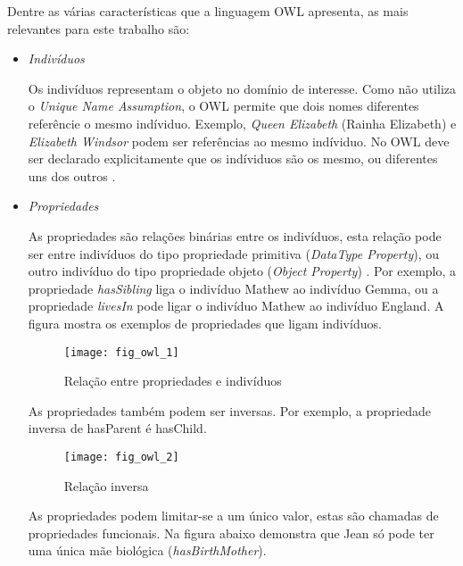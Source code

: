 Dentre as várias características que a linguagem OWL apresenta, as mais 
relevantes para este trabalho são:

\begin{itemize}
    
    \item \textit{Indivíduos}
    
    Os indivíduos representam o objeto no domínio de interesse. Como não 
    utiliza o \textit{Unique Name Assumption}, o OWL permite que dois nomes 
    diferentes referêncie o mesmo indíviduo. Exemplo, \textit{Queen Elizabeth} 
    (Rainha Elizabeth) e \textit{Elizabeth Windsor} podem ser referências ao 
    mesmo indíviduo. No OWL deve ser declarado explicitamente que os indíviduos 
    são os mesmo, ou diferentes uns dos outros \cite{horridge2004practical}.
    
    \item \textit{Propriedades}
    
    As propriedades são relações binárias entre os indivíduos, esta relação pode 
    ser entre indivíduos do tipo propriedade primitiva 
    (\textit{DataType Property}), ou outro indivíduo do tipo propriedade objeto 
    (\textit{Object Property}) \cite{horridge2004practical}. Por exemplo, a 
    propriedade \textit{hasSibling} liga o indivíduo Mathew ao indivíduo Gemma, 
    ou a propriedade \textit{livesIn} pode ligar o indivíduo Mathew ao indivíduo 
    England. A figura mostra os exemplos de propriedades que ligam indivíduos.
    
    \begin{figure}[!h]
      \centering
      \texttt{[image: fig\_owl\_1]} 
      \caption{Relação entre propriedades e indivíduos}
      \label{fig:fig_owl_1} 
    \end{figure}

    As propriedades também podem ser inversas. Por exemplo, a propriedade 
    inversa de hasParent é hasChild.
    
    \begin{figure}[!h]
      \centering
      \texttt{[image: fig\_owl\_2]} 
      \caption{Relação inversa}
      \label{fig:fig_owl_2} 
    \end{figure}

    \vskip 4cm
    
    As propriedades podem limitar-se a um único valor, estas são chamadas de 
    propriedades funcionais. Na figura abaixo demonstra que Jean só pode ter 
    uma única mãe biológica (\textit{hasBirthMother}).
    

\end{itemize}
